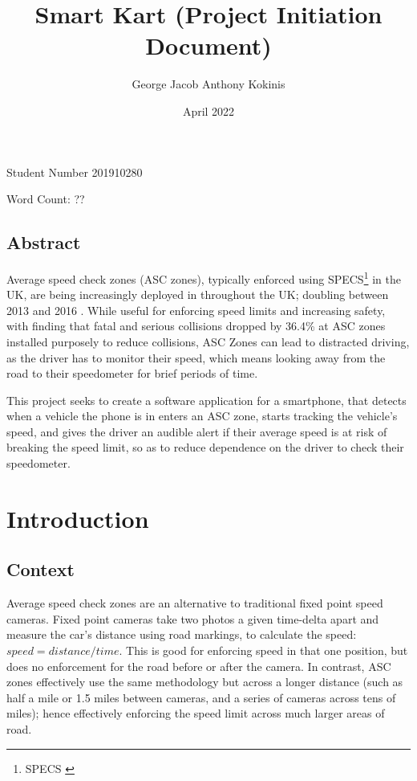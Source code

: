 \documentclass[11pt, a4paper, notitlepage]{report}
\title{Smart Kart (Project Initiation Document)}
\date{April 2022}
\author{George Jacob Anthony Kokinis}
\begin{document}
\maketitle
\begin{center}
    Student Number 201910280
    
    Word Count: ?? %
\end{center}
\newpage
\section{Abstract}
Average speed check zones (ASC zones), typically enforced using SPECS\footnote{SPECS \citep{specsjenop}} in the UK, are being increasingly deployed in throughout the UK; doubling between 2013 and 2016 \citep{BBCSpeedCameraDoubled}. While useful for enforcing speed limits and increasing safety, with \citet{owenAllsop} finding that fatal and serious collisions dropped by 36.4\% at ASC zones installed purposely to reduce collisions, ASC Zones can lead to distracted driving, as the driver has to monitor their speed, which means looking away from the road to their speedometer for brief periods of time.

This project seeks to create a software application for a smartphone, that detects when a vehicle the phone is in enters an ASC zone, starts tracking the vehicle's speed, and gives the driver an audible alert if their average speed is at risk of breaking the speed limit, so as to reduce dependence on the driver to check their speedometer.

\tableofcontents

\chapter{Introduction}
\section{Context}
Average speed check zones are an alternative to traditional fixed point speed cameras. Fixed point cameras take two photos a given time-delta apart and measure the car's distance using road markings, to calculate the speed: $ speed = distance/time $. This is good for enforcing speed in that one position, but does no enforcement for the road before or after the camera. In contrast, ASC zones effectively use the same methodology but across a longer distance (such as half a mile or 1.5 miles between cameras, and a series of cameras across tens of miles); hence effectively enforcing the speed limit across much larger areas of road.
\end{document}
